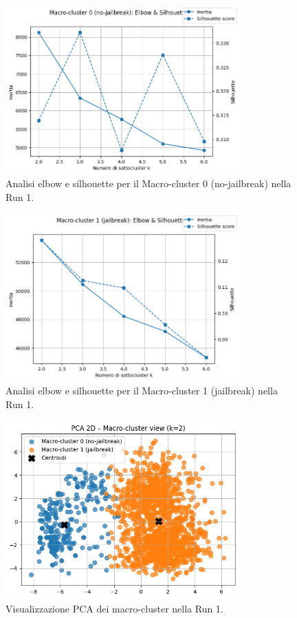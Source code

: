 \documentclass[a4paper,12pt]{article}
\begin{document}
\begin{figure}[h]
    \centering
    \includegraphics[width=0.8\textwidth]{run1-elbow0.png}
    \caption{Analisi elbow e silhouette per il Macro-cluster 0 (no-jailbreak) nella Run 1.}
    \label{fig:run1_elbow0}
\end{figure}

\begin{figure}[h]
    \centering
    \includegraphics[width=0.8\textwidth]{run1-elbow1.png}
    \caption{Analisi elbow e silhouette per il Macro-cluster 1 (jailbreak) nella Run 1.}
    \label{fig:run1_elbow1}
\end{figure}

\begin{figure}[h]
    \centering
    \includegraphics[width=0.8\textwidth]{run1-pca-tot.png}
    \caption{Visualizzazione PCA dei macro-cluster nella Run 1.}
    \label{fig:run1_pca_tot}
\end{figure}
\end{document}

